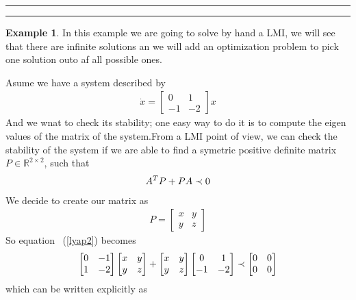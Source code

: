 \documentclass[nols]{tufte-handout}
\theoremstyle{definition}
\newtheorem{exmp}{Example}[section]
\begin{document}
\vspace{0.5cm} 
\hrule
\hrule
\begin{exmp}\label{lmi_hand}
In this example we are going to solve by hand a LMI, we will see that there are infinite solutions an we will add an optimization problem to pick one solution outo af all possible ones.

    Asume we have a system described by
\begin{align}
    \dot x=
    \begin{bmatrix}
        0 & 1\\
        -1 & -2
    \end{bmatrix}x
\end{align}
And we wnat to check its stability; one easy way to do it is to compute the eigen values of the matrix of the system.From a LMI point of view, we can check the stability of the system if we are able to find a symetric positive definite matrix $P\in \mathbb{R}^{2\times 2}$, such that
\begin{align}\label{lyap2}
    A^TP+PA\prec 0
\end{align}
We decide to create our matrix as
\begin{align}
    P=\begin{bmatrix}
        x & y \\y &z
    \end{bmatrix}
\end{align}
So equation ~(\ref{lyap2}) becomes
\begin{align}
    \begin{bmatrix}
        0 & -1\\
        1 & -2
    \end{bmatrix}
    \begin{bmatrix}
        x & y \\y &z
    \end{bmatrix}+
    \begin{bmatrix}
        x & y \\y &z
    \end{bmatrix}
    \begin{bmatrix}
        0 & 1\\
        -1 & -2
    \end{bmatrix}
    \prec \begin{bmatrix}
        0 & 0\\0 & 0
    \end{bmatrix}
\end{align}
which can be written explicitly as 

\end{exmp}
\end{document}

